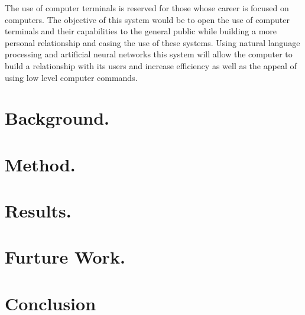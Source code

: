 \documentclass[12pt]{article}
\begin{document}
The use of computer terminals is reserved for those whose career is focused on computers. The objective of this system would be to open the use of computer terminals and their capabilities to the general public while building a more personal relationship and easing the use of these systems. Using natural language processing and artificial neural networks this system will allow the computer to build a relationship with its users and increase efficiency as well as the appeal of using low level computer commands.


\section{Background.}


\section{Method.}


\section{Results.}


\section{Furture Work.}


\section{Conclusion}

\end{document}
